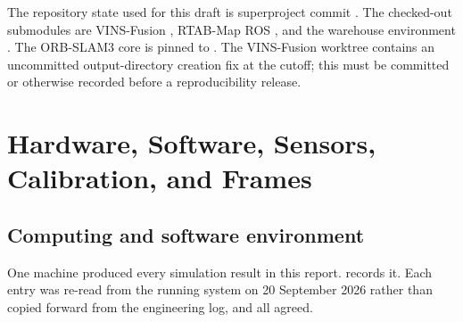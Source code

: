 The repository state used for this draft is superproject commit
. The checked-out submodules are
VINS-Fusion , RTAB-Map ROS
, and the warehouse environment
. The ORB-SLAM3 core is pinned to
. The VINS-Fusion worktree contains
an uncommitted output-directory creation fix at the cutoff; this must be committed
or otherwise recorded before a reproducibility release.

\section{Hardware, Software, Sensors, Calibration, and Frames}
\label{sec:platform-calibration}

\subsection{Computing and software environment}

One machine produced every simulation result in this report.
 records it. Each entry was re-read from the
running system on 20 September 2026 rather than copied forward from the
engineering log, and all agreed.

